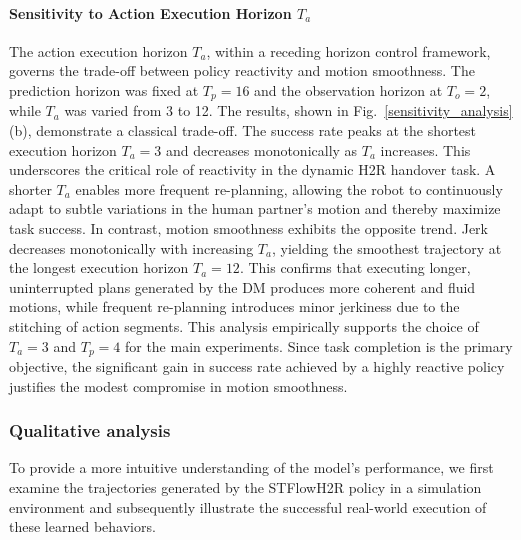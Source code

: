 \documentclass[final,5p,times,twocolumn]{elsarticle}
\begin{document}
\paragraph{Sensitivity to Action Execution Horizon $T_a$}
The action execution horizon $T_a$, within a receding horizon control framework, governs the trade-off between policy reactivity and motion smoothness. The prediction horizon was fixed at $T_p=16$ and the observation horizon at $T_o=2$, while $T_a$ was varied from 3 to 12. The results, shown in Fig.~\ref{sensitivity_analysis}(b), demonstrate a classical trade-off. The success rate peaks at the shortest execution horizon $T_a=3$ and decreases monotonically as $T_a$ increases. This underscores the critical role of reactivity in the dynamic H2R handover task. A shorter $T_a$ enables more frequent re-planning, allowing the robot to continuously adapt to subtle variations in the human partner’s motion and thereby maximize task success. In contrast, motion smoothness exhibits the opposite trend. Jerk decreases monotonically with increasing $T_a$, yielding the smoothest trajectory at the longest execution horizon $T_a=12$. This confirms that executing longer, uninterrupted plans generated by the DM produces more coherent and fluid motions, while frequent re-planning introduces minor jerkiness due to the stitching of action segments. This analysis empirically supports the choice of $T_a=3$ and $T_p=4$ for the main experiments. Since task completion is the primary objective, the significant gain in success rate achieved by a highly reactive policy justifies the modest compromise in motion smoothness.


\subsubsection{Qualitative analysis}
To provide a more intuitive understanding of the model's performance, we first examine the trajectories generated by the STFlowH2R policy in a simulation environment and subsequently illustrate the successful real-world execution of these learned behaviors.
\end{document}
